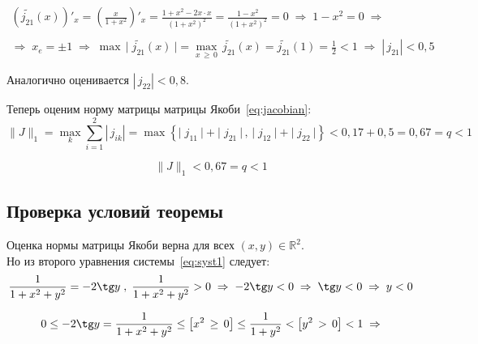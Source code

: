 \documentclass[a4paper,12pt]{article}
\begin{document}
\begin{equation*}\begin{split}
    \left(\widetilde{j_{21}}(x) \right)'_x =
    \left(\frac{x}{1+x^2} \right)'_x =
    \frac {1+x^2 - 2x\cdot x}{(1+x^2)^2} =
    \frac {1-x^2}{(1+x^2)^2} = 0    \;\Rightarrow\; 
    1-x^2 = 0       \;\Rightarrow \\\\ \Rightarrow\;
    x_e = \pm1      \;\Rightarrow\;
    \max\,\lvert \;\widetilde{j_{21}} (x) \:\rvert = 
    \max_{x\,\geq\,0 }\,\widetilde{j_{21}}(x) = 
    \widetilde{j_{21}}(1) = \frac12 < 1 \;\Rightarrow\;
    \left|\, j_{21} \right| < 0,5
\end{split}\end{equation*}
\par\bigskip
Аналогично оценивается $\left|\, j_{22} \right| < 0,8$.
\par\bigskip\par\bigskip

Теперь оценим норму матрицы матрицы Якоби~\eqref{eq:jacobian}:
$$
    \lVert J \rVert_1 = \max_k  \sum_{i=1}^2 \left|\, j_{ik} \right| =
    \max \left\{ \lvert\;j_{11}\:\rvert + \lvert\;j_{21}\:\rvert
           \,,\, \lvert\;j_{12}\:\rvert + \lvert\;j_{22}\:\rvert \right\}
    < 0,17 + 0,5 = 0,67 = q < 1
$$

\begin{equation}\label{eq:q}
    \lVert J \rVert_1 < 0,67 = q < 1
\end{equation}
\par\bigskip\par\bigskip



\newpage
\subsection{Проверка условий теоремы}
\par\bigskip

Оценка нормы матрицы Якоби верна для всех $ (x,y) \in \mathbb{R}^2 $.\\ 
Но из второго уравнения системы~\eqref{eq:syst1} следует:
$$
    \frac{1}{1+x^2+y^2} = -2 \tg y \;,\; 
    \frac{1}{1+x^2+y^2} > 0              \;\Rightarrow\;
    -2 \tg y < 0                         \;\Rightarrow\;
    \tg y < 0                            \;\Rightarrow\;
    y < 0  
$$

$$
    0 \leq -2 \tg y = \frac{1}{1+x^2+y^2}   \leq
    \left[x^2\,\geq\,0\right]               \leq
    \frac{1}{1+y^2}                         <
    \left[y^2\,>\,0\right] < 1              \;\Rightarrow
$$
\end{document}
